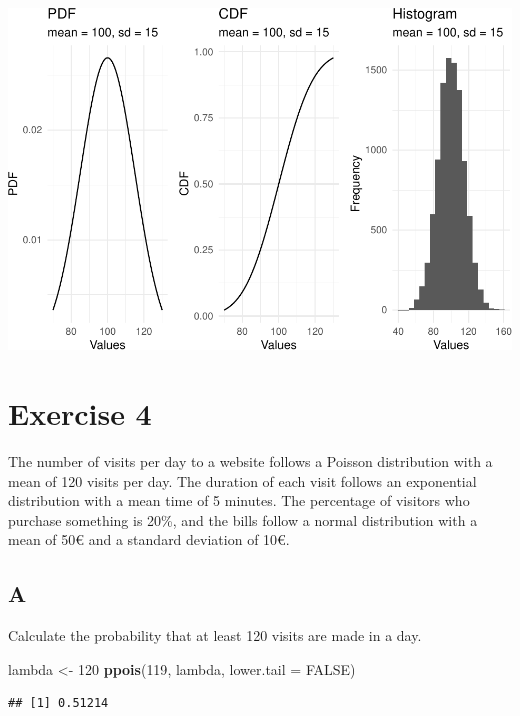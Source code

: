 \documentclass[
]{article}
\newenvironment{Shaded}{\begin{snugshade}}{\end{snugshade}}
\newcommand{\DataTypeTok}[1]{\textcolor[rgb]{0.13,0.29,0.53}{#1}}
\newcommand{\DecValTok}[1]{\textcolor[rgb]{0.00,0.00,0.81}{#1}}
\newcommand{\KeywordTok}[1]{\textcolor[rgb]{0.13,0.29,0.53}{\textbf{#1}}}
\newcommand{\NormalTok}[1]{#1}
\newcommand{\OtherTok}[1]{\textcolor[rgb]{0.56,0.35,0.01}{#1}}
\newcommand{\StringTok}[1]{\textcolor[rgb]{0.31,0.60,0.02}{#1}}
\begin{document}
\includegraphics{es_files/figure-latex/unnamed-chunk-12-1.pdf}

\hypertarget{exercise-4}{%
\section{Exercise 4}\label{exercise-4}}

The number of visits per day to a website follows a Poisson distribution
with a mean of 120 visits per day. The duration of each visit follows an
exponential distribution with a mean time of 5 minutes. The percentage
of visitors who purchase something is 20\%, and the bills follow a
normal distribution with a mean of 50€ and a standard deviation of 10€.

\hypertarget{a-3}{%
\subsection{A}\label{a-3}}

Calculate the probability that at least 120 visits are made in a day.

\begin{Shaded}
\begin{Highlighting}[]
\NormalTok{lambda \textless{}{-}}\StringTok{ }\DecValTok{120}
\KeywordTok{ppois}\NormalTok{(}\DecValTok{119}\NormalTok{, lambda, }\DataTypeTok{lower.tail =} \OtherTok{FALSE}\NormalTok{)}
\end{Highlighting}
\end{Shaded}

\begin{verbatim}
## [1] 0.51214
\end{verbatim}
\end{document}
